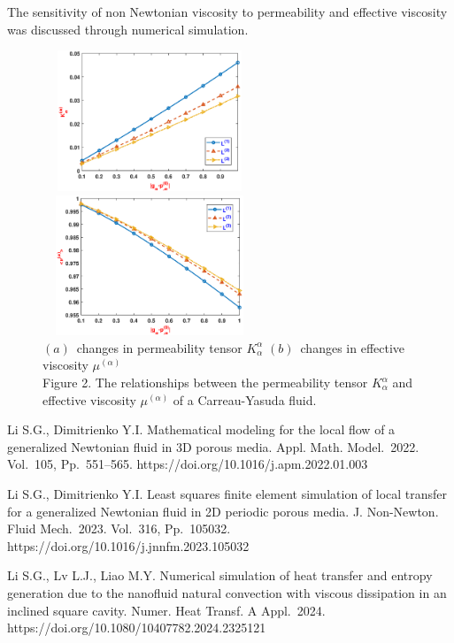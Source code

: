 \documentclass[12pt]{llncs}
\begin{document}
The sensitivity of non Newtonian viscosity to permeability and effective viscosity was discussed through numerical simulation.
\begin{figure}[htp]
\centering
\includegraphics[width=6.4cm,height=4.2cm]{2_1.eps}
\includegraphics[width=6.4cm,height=4.2cm]{2_2.eps}\\
$(a)$\ changes in permeability tensor $K_{\alpha}^{\alpha}$\quad\quad\quad
$(b)$\ changes in effective viscosity $\mu^{(\alpha)}$\\
\small{Figure 2. The relationships between the permeability tensor $K_{\alpha}^{\alpha}$
and effective viscosity $\mu^{(\alpha)}$  of a Carreau-Yasuda fluid.}
\end{figure}


\begin{thebibliography}{9} %
 Li S.G., Dimitrienko Y.I.
    Mathematical modeling for the local flow of a generalized Newtonian fluid in 3D porous media.
    Appl. Math. Model.~2022. Vol.~105, Pp.~551--565. https://doi.org/10.1016/j.apm.2022.01.003

 Li S.G., Dimitrienko Y.I.
    Least squares finite element simulation of local transfer for a generalized Newtonian fluid in 2D periodic porous media.
    J. Non-Newton. Fluid Mech.~2023. Vol.~316, Pp.~105032. https://doi.org/10.1016/j.jnnfm.2023.105032

 Li S.G., Lv L.J., Liao M.Y. Numerical simulation of heat transfer and entropy generation due to the nanofluid natural convection with viscous dissipation in an inclined square cavity. Numer. Heat Transf. A Appl.~2024. https://doi.org/10.1080/10407782.2024.2325121
\end{thebibliography}
\end{document}
